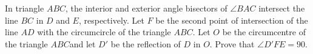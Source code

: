 In triangle $ABC$,  the interior and exterior angle bisectors of $ \angle BAC$ intersect the line $BC$ in $D $ and $E$,  respectively. Let $F$ be the second point of intersection of the line $AD$ with the circumcircle of the triangle $ ABC$. Let $O$ be the circumcentre of the triangle $ ABC $and let $D'$ be the reflection of $D$ in $O$. Prove that $ \angle D'FE =90.$